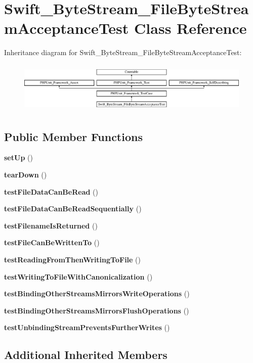 \section{Swift\+\_\+\+Byte\+Stream\+\_\+\+File\+Byte\+Stream\+Acceptance\+Test Class Reference}
\label{class_swift___byte_stream___file_byte_stream_acceptance_test}
Inheritance diagram for Swift\+\_\+\+Byte\+Stream\+\_\+\+File\+Byte\+Stream\+Acceptance\+Test\+:\begin{figure}[H]
\begin{center}
\leavevmode
\includegraphics[height=2.480620cm]{class_swift___byte_stream___file_byte_stream_acceptance_test}
\end{center}
\end{figure}
\subsection*{Public Member Functions}
\begin{DoxyCompactItemize}
\item 
{\bf set\+Up} ()
\item 
{\bf tear\+Down} ()
\item 
{\bf test\+File\+Data\+Can\+Be\+Read} ()
\item 
{\bf test\+File\+Data\+Can\+Be\+Read\+Sequentially} ()
\item 
{\bf test\+Filename\+Is\+Returned} ()
\item 
{\bf test\+File\+Can\+Be\+Written\+To} ()
\item 
{\bf test\+Reading\+From\+Then\+Writing\+To\+File} ()
\item 
{\bf test\+Writing\+To\+File\+With\+Canonicalization} ()
\item 
{\bf test\+Binding\+Other\+Streams\+Mirrors\+Write\+Operations} ()
\item 
{\bf test\+Binding\+Other\+Streams\+Mirrors\+Flush\+Operations} ()
\item 
{\bf test\+Unbinding\+Stream\+Prevents\+Further\+Writes} ()
\end{DoxyCompactItemize}
\subsection*{Additional Inherited Members}


